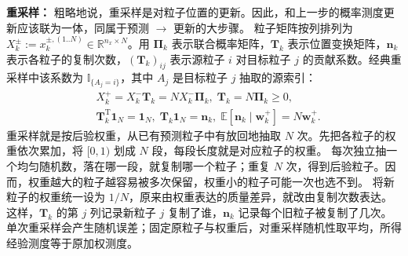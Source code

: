 \textbf{重采样：}
粗略地说，重采样是对粒子位置的更新。因此，和上一步的概率测度更新应该联为一体，同属于预测 $\to $ 更新的大步骤。
粒子矩阵按列排列为 $X_k^\pm:=x_k^{\pm,(1..N)}\in\mathbb R^{n_x\times N}$。用 $\bm\Pi_k$ 表示联合概率矩阵，$\bm T_k$ 表示位置变换矩阵，$\bm n_k$ 表示各粒子的复制次数，$(\bm T_k)_{ij}$ 表示源粒子 $i$ 对目标粒子 $j$ 的贡献系数。经典重采样中该系数为 $\mathbb I_{\{A_j=i\}}$，其中 $A_j$ 是目标粒子 $j$ 抽取的源索引：
\begin{equation}\label{cw:eq:resampling}
\begin{aligned}
&X_k^+=X_k^-\bm T_k=NX_k^-\bm\Pi_k,\;\bm T_k=N\bm\Pi_k\geq0,\\
&\bm T_k^{\mathrm T}\mathbf1_N=\mathbf1_N,\;\bm T_k\mathbf1_N=\bm n_k,\;\mathbb E[\bm n_k\mid\bm w_k^+]=N\bm w_k^+.
\end{aligned}
\end{equation}
重采样就是按后验权重，从已有预测粒子中有放回地抽取 $N$ 次。先把各粒子的权重依次累加，将 $[0,1)$ 划成 $N$ 段，每段长度就是对应粒子的权重。
每次独立抽一个均匀随机数，落在哪一段，就复制哪一个粒子；重复 $N$ 次，得到后验粒子。因而，权重越大的粒子越容易被多次保留，权重小的粒子可能一次也选不到。
将新粒子的权重统一设为 $1/N$，原来由权重表达的质量差异，就改由复制次数表达。
这样，$\bm T_k$ 的第 $j$ 列记录新粒子 $j$ 复制了谁，$\bm n_k$ 记录每个旧粒子被复制了几次。单次重采样会产生随机误差；固定原粒子与权重后，对重采样随机性取平均，所得经验测度等于原加权测度。
